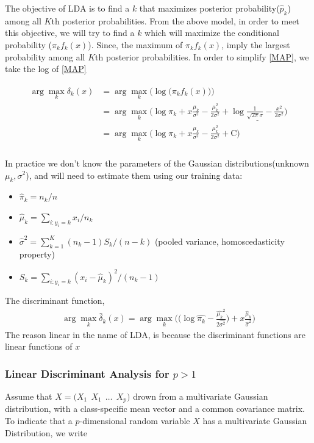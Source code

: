 \documentclass[12pt,a4paper]{article}%
\theoremstyle{definition}
\theoremstyle{plain}
\numberwithin{equation}{section}
\begin{document}
The objective of LDA is to find a $k$ that maximizes posterior probability($\hat{p}_{k}$) among all $K$th posterior probabilities. 
From the above model, in order to meet this objective, we will try to find a $k$ which will maximize the conditional probability ($\pi_{k}f_{k}(x)$).
Since, the maximum of $\pi_{k}f_{k}(x)$, imply the largest probability among all $K$th posterior probabilities.
In order to simplify \eqref{MAP}, we take the log of \eqref{MAP}

\begin{align}
\begin{split}
\arg\max_{k}  \delta_{k}(x) &= \arg\max_{k} \bigg( \log \big(\pi_{k}f_{k}(x)\big)\bigg) \\
							&= \arg\max_{k} \bigg( \log \pi_{k} + x \frac{\mu_{k}}{\sigma^{2}}-\frac{\mu_{k}^{2}}{2\sigma^{2}}+ \underline{\log \frac{1}{\sqrt{2\pi}\sigma}-\frac{x^{2}}{2\sigma^{2}}} \bigg) \\
							&= \arg\max_{k} \bigg( \log \pi_{k} + x \frac{\mu_{k}}{\sigma^{2}}-\frac{\mu_{k}^{2}}{2\sigma^{2}}+ \text{C} \bigg) \\
\end{split}
\end{align}

In practice we don't know the parameters of the Gaussian distributions(unknown $\mu_{k}, \sigma^{2}$), and will need to estimate them using our training data:

\begin{itemize}
\item $\hat{\pi}_{k} = n_{k}/n$
\item $\hat{\mu}_{k}=\sum\limits_{i:y_{i}=k}x_{i}/n_{k}$
\item $\hat{\sigma}^{2} = \sum\limits_{k=1}^{K} (n_{k}-1)S_{k}/(n-k)$ (pooled variance, homoscedasticity property)
\item $S_{k} = \sum\limits_{i:y_{i}=k}(x_{i}-\hat{\mu}_{k})^{2}/(n_{k}-1)$
\end{itemize}

The discriminant function,
\begin{gather}
\arg\max_{k}  \hat{\delta}_{k}(x) = \arg\max_{k} \bigg( \big( \log \hat{\pi_{k}} -\frac{\hat{\mu_{k}}^{2}}{2 \hat{\sigma^{2}}} \big) + x \frac{\hat{\mu}_{k}}{\hat{\sigma}^{2}} \bigg)
\label{discriminantfunction}
\end{gather}
The reason linear in the name of LDA, is because the discriminant functions are linear functions of $x$

\subsubsection{\textbf{Linear Discriminant Analysis for $p > 1$}}
Assume that $X = \big( X_{1}~~X_{1}~~\dots~~X_{p} \big)$ drown from a multivariate Gaussian distribution, with a class-specific mean vector and a common covariance matrix.
To indicate that a $p$-dimensional random variable $X$ has a multivariate Gaussian Distribution, we write 
\end{document}
